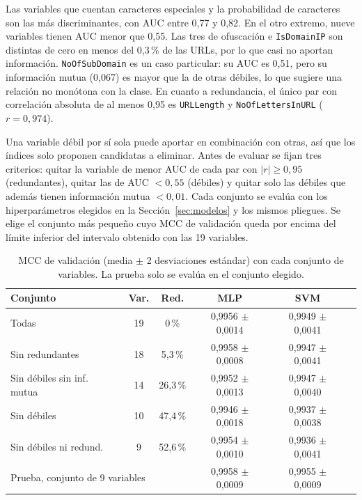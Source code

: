 \documentclass[journal]{IEEEtran}
\begin{document}
Las variables que cuentan caracteres especiales y la probabilidad de caracteres son las más
discriminantes, con AUC entre 0,77 y 0,82. En el otro extremo, nueve variables tienen AUC menor que
0,55. Las tres de ofuscación e \texttt{IsDomainIP} son distintas de cero en menos del 0,3\,\% de las
URLs, por lo que casi no aportan información. \texttt{NoOfSubDomain} es un caso particular: su AUC es 0,51, pero su
información mutua (0,067) es mayor que la de otras débiles, lo que sugiere una relación no monótona
con la clase. En cuanto a redundancia, el único par con correlación absoluta de al menos 0,95 es
\texttt{URLLength} y \texttt{NoOfLettersInURL} ($r=0{,}974$).

Una variable débil por sí sola puede aportar en combinación con otras, así que los índices solo
proponen candidatas a eliminar. Antes de evaluar se fijan tres criterios: quitar la variable de menor
AUC de cada par con $|r|\ge0{,}95$ (redundantes), quitar las de AUC $<0{,}55$ (débiles) y quitar solo
las débiles que además tienen información mutua $<0{,}01$. Cada conjunto se evalúa con los
hiperparámetros elegidos en la Sección~\ref{sec:modelos} y los mismos pliegues. Se elige el conjunto
más pequeño cuyo MCC de validación queda por encima del límite inferior del intervalo obtenido con las
19 variables.

\begin{table}[t]
\centering
\caption{MCC de validación (media $\pm$ 2 desviaciones estándar) con cada conjunto de variables. La
prueba solo se evalúa en el conjunto elegido.}
\label{tab:seleccion}
\footnotesize
\setlength{\tabcolsep}{3pt}
\begin{tabular}{lccccc}
\toprule
\textbf{Conjunto} & \textbf{Var.} & \textbf{Red.} & \textbf{MLP} & \textbf{SVM} \\
\midrule
Todas & 19 & 0\,\% & 0,9956 $\pm$ 0,0014 & 0,9949 $\pm$ 0,0041 \\
Sin redundantes & 18 & 5,3\,\% & 0,9958 $\pm$ 0,0008 & 0,9947 $\pm$ 0,0041 \\
Sin débiles sin inf. mutua & 14 & 26,3\,\% & 0,9952 $\pm$ 0,0013 & 0,9947 $\pm$ 0,0040 \\
Sin débiles & 10 & 47,4\,\% & 0,9946 $\pm$ 0,0018 & 0,9937 $\pm$ 0,0038 \\
Sin débiles ni redund. & 9 & 52,6\,\% & 0,9954 $\pm$ 0,0010 & 0,9936 $\pm$ 0,0041 \\
\midrule
\multicolumn{3}{l}{Prueba, conjunto de 9 variables} & 0,9958 $\pm$ 0,0009 & 0,9955 $\pm$ 0,0009 \\
\bottomrule
\end{tabular}
\end{table}
\end{document}
